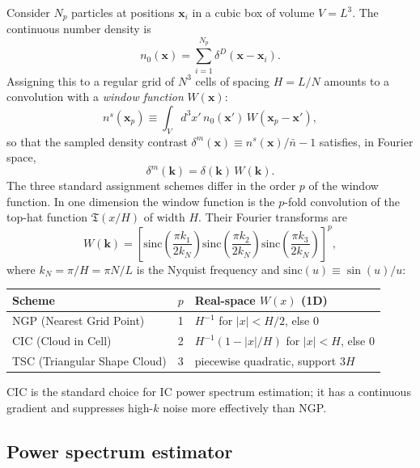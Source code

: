 \documentclass[12pt]{article}
\newcommand{\bx}{\mathbf{x}}
\newcommand{\bk}{\mathbf{k}}
\begin{document}
Consider $N_p$ particles at positions $\bx_i$ in a cubic box of
volume $V = L^3$.  The continuous number density is
%
\begin{equation}
  n_0(\bx) = \sum_{i=1}^{N_p} \delta^D(\bx - \bx_i).
  \label{eq:n0}
\end{equation}
%
Assigning this to a regular grid of $N^3$ cells of spacing $H = L/N$
amounts to a convolution with a \emph{window function} $W(\bx)$:
%
\begin{equation}
  n^s(\bx_p) \equiv \int_V d^3x'\,n_0(\bx')\,W(\bx_p - \bx'),
  \label{eq:ns}
\end{equation}
%
so that the sampled density contrast
$\delta^m(\bx) \equiv n^s(\bx)/\bar{n} - 1$ satisfies, in Fourier
space,
%
\begin{equation}
  \delta^m(\bk) = \delta(\bk)\,W(\bk).
  \label{eq:deltaW}
\end{equation}
%
The three standard assignment schemes differ in the order $p$ of the
window function.  In one dimension the window function is the
$p$-fold convolution of the top-hat function
$\mathfrak{T}(x/H)$ of width $H$.  Their Fourier transforms are
%
\begin{equation}
  W(\bk) = \left[\mathrm{sinc}\!\left(\frac{\pi k_1}{2k_N}\right)
                 \mathrm{sinc}\!\left(\frac{\pi k_2}{2k_N}\right)
                 \mathrm{sinc}\!\left(\frac{\pi k_3}{2k_N}\right)
            \right]^p,
  \label{eq:Wk}
\end{equation}
%
where $k_N = \pi/H = \pi N/L$ is the Nyquist frequency and
$\mathrm{sinc}(u) \equiv \sin(u)/u$:
%
\begin{center}
\begin{tabular}{lll}
\hline
Scheme & $p$ & Real-space $W(x)$ (1D) \\
\hline
NGP (Nearest Grid Point) & 1 & $H^{-1}$ for $|x|<H/2$, else 0 \\
CIC (Cloud in Cell)      & 2 & $H^{-1}(1-|x|/H)$ for $|x|<H$, else 0 \\
TSC (Triangular Shape Cloud) & 3 & piecewise quadratic, support $3H$ \\
\hline
\end{tabular}
\end{center}
%
CIC is the standard choice for IC power spectrum estimation; it has a
continuous gradient and suppresses high-$k$ noise more effectively
than NGP.

\subsection{Power spectrum estimator}
\label{app:pk_estimator}
\end{document}
